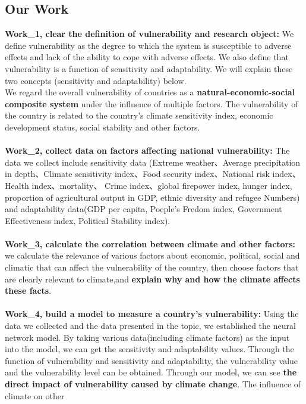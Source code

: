 \documentclass{mcmthesis}
\begin{document}
\subsection{Our Work}
  \textbf{Work\_1, clear the definition of vulnerability and research object:} We 
  define vulnerability as the degree to which the system is susceptible to adverse effects 
  and lack of the ability to cope with adverse effects. We also define that vulnerability 
  is a function of sensitivity and adaptability. We will explain these two concepts 
  (sensitivity and adaptability) below.\\ We regard the overall vulnerability of 
  countries as a \textbf{natural-economic-social composite system} under the influence of 
  multiple factors. The vulnerability of the country is related to the country's 
  climate sensitivity index, economic development status, social stability and 
  other factors.\\\\
  \textbf{Work\_2, collect data on factors affecting national vulnerability:} The data we
  collect include sensitivity data (Extreme weather、Average precipitation in depth、Climate
  sensitivity index、Food security index、National risk index、Health index、mortality、
  Crime index、global firepower index, hunger index,  proportion of agricultural output 
  in GDP, ethnic diversity and refugee Numbers) and adaptability data(GDP per capita, 
  Poeple's Fredom index, Government Effectiveness index, Political Stability index).\\\\
  \textbf{Work\_3, calculate the correlation between climate and other factors:} we 
  calculate the relevance of various factors about economic, political, social 
  and climatic that can affect the vulnerability of the country, then choose 
  factors that are clearly relevant to climate,and \textbf{explain why and how the 
  climate affects these facts}.\\\\
  \textbf{Work\_4, build a model to measure a country's vulnerability:} Using the data 
  we collected and the data presented in the topic, we established the neural network 
  model. By taking various data(including climate factors) as the input into the model, 
  we can get the sensitivity and adaptability values. Through the function of 
  vulnerability and sensitivity and adaptability, the vulnerability value and the 
  vulnerability level can be obtained. Through our model, we can see \textbf{the direct 
  impact of vulnerability caused by climate change}. The influence of climate on other 
\end{document}
